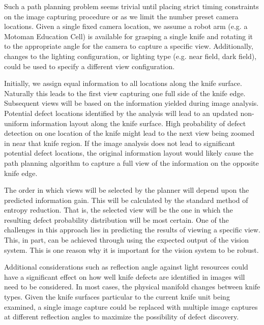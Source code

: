 \documentclass[letterpaper, 10 pt, conference]{ieeeconf}  %
\begin{document}
Such a path planning problem seems trivial until placing strict timing constraints on the image capturing procedure or as we limit the number preset camera locations. Given a single fixed camera location, we assume a robot arm (e.g. a Motoman Education Cell) is available for grasping a single knife and rotating it to the appropriate angle for the camera to capture a specific view. Additionally, changes to the lighting configuration, or lighting type (e.g. near field, dark field), could be used to specify a different view configuration.

Initially, we assign equal information to all locations along the knife surface. Naturally this leads to the first view capturing one full side of the knife edge. Subsequent views will be based on the information yielded during image analysis. Potential defect locations identified by the analysis will lead to an updated non-uniform information layout along the knife surface. High probability of defect detection on one location of the knife might lead to the next view being zoomed in near that knife region. If the image analysis does not lead to significant potential defect locations, the original information layout would likely cause the path planning algorithm to capture a full view of the information on the opposite knife edge.

The order in which views will be selected by the planner will depend upon the predicted information gain. This will be calculated by the standard method of entropy reduction. That is, the selected view will be the one in which the resulting defect probability distribution will be most certain. One of the challenges in this approach lies in predicting the results of viewing a specific view. This, in part, can be achieved through using the expected output of the vision system. This is one reason why it is important for the vision system to be robust.

Additional considerations such as reflection angle against light resources could have a significant effect on how well knife defects are identified in images will need to be considered. In most cases, the physical manifold changes between knife types. Given the knife surfaces particular to the current knife unit being examined, a single image capture could be replaced with multiple image captures at different reflection angles to maximize the possibility of defect discovery.
\end{document}
